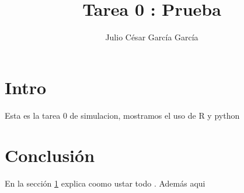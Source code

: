 \documentclass{article}
\title{Tarea 0 : Prueba}
\author{Julio César García García}
\begin{document}
	
\maketitle


	\section{Intro}\label{intro}
	 Esta es la tarea 0 de simulacion, mostramos el uso de R y python \citet{otra}
	 
	 \section{Conclusión}
	 En la sección \ref{intro} explica coomo ustar todo \citep{libro} .
	 Además \citet{art} aqui
	


\end{document}
